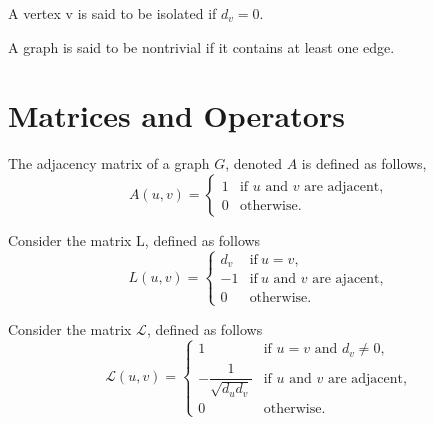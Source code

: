\begin{definition}
\label{def:IsIsolated}
\leanok
A vertex v is said to be isolated if $d_v = 0$.
\end{definition}



\begin{definition}
\label{def:NonTrivial}
\leanok
A graph is said to be nontrivial if it contains at least one edge.
\end{definition}



\section{Matrices and Operators}

\begin{definition}
\label{def:Adjacency}
\leanok
The adjacency matrix of a graph $G$, denoted $A$ is defined as follows,
\[
A(u,v)=
\begin{cases}
    1 & \text{if } u \text{ and } v \text{ are adjacent}, \\
    0 & \text{otherwise}.
\end{cases}
\]
\end{definition}


\begin{definition}
\label{def:L}
\leanok
Consider the matrix L, defined as follows
\[
L(u,v)=
\begin{cases}
  d_v & \text{if}\ u=v, \\
  -1 & \text{if}\ u \text{ and }v \text{ are ajacent},\\
    0 & \text{otherwise}.
\end{cases}
\]
\end{definition}



\begin{definition} 
\label{def:Laplacian}
\leanok
Consider the matrix $\mathcal{L}$, defined as follows
\[
\mathcal{L}(u,v) = \left\{
\begin{array}{cl}
    1 & \text{if } u = v \text{ and } d_v \neq 0, \\[1.5ex]
    -\dfrac{1}{\sqrt{d_u d_v}} & \text{if } u \text{ and } v \text{ are adjacent}, \\[1.5ex]
    0 & \text{otherwise}.
\end{array}
\right.
\]
\end{definition}




